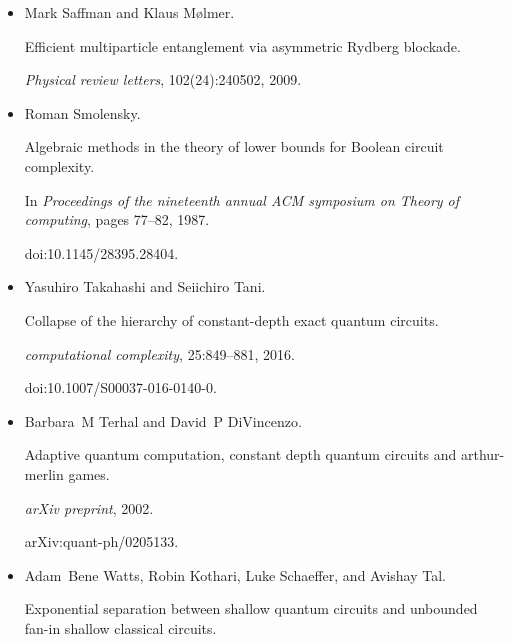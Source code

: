 \begin{itemize}
doi:10.4230/LIPIcs.ITCS.2021.32.





\item[] 
[22]

Mark Saffman and Klaus Mølmer.


Efficient multiparticle entanglement via asymmetric Rydberg
blockade.


\emph{Physical review letters}, 102(24):240502, 2009.





\item[] 
[23]

Roman Smolensky.


Algebraic methods in the theory of lower bounds for Boolean circuit
complexity.


In \emph{Proceedings of the nineteenth annual ACM symposium on Theory
of computing}, pages 77–82, 1987.


doi:10.1145/28395.28404.





\item[] 
[24]

Yasuhiro Takahashi and Seiichiro Tani.


Collapse of the hierarchy of constant-depth exact quantum circuits.


\emph{computational complexity}, 25:849–881, 2016.


doi:10.1007/S00037-016-0140-0.





\item[] 
[25]

Barbara M Terhal and David P DiVincenzo.


Adaptive quantum computation, constant depth quantum circuits and
arthur-merlin games.


\emph{arXiv preprint}, 2002.


arXiv:quant-ph/0205133.





\item[] 
[26]

Adam Bene Watts, Robin Kothari, Luke Schaeffer, and Avishay Tal.


Exponential separation between shallow quantum circuits and unbounded
fan-in shallow classical circuits.



\end{itemize}
